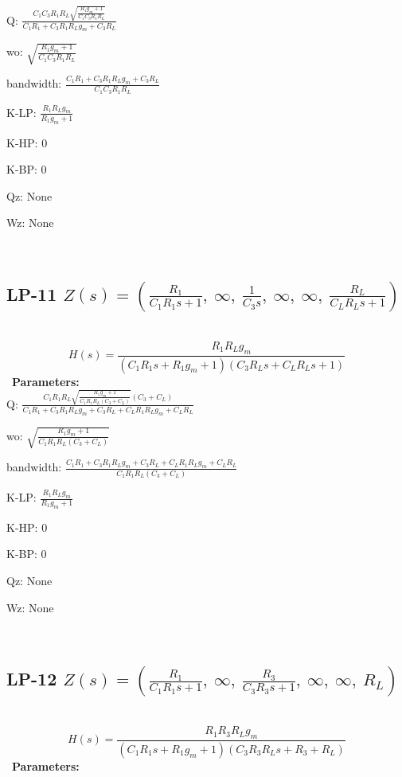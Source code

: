 \documentclass{article}
\begin{document}
Q: $\frac{C_{1} C_{3} R_{1} R_{L} \sqrt{\frac{R_{1} g_{m} + 1}{C_{1} C_{3} R_{1} R_{L}}}}{C_{1} R_{1} + C_{3} R_{1} R_{L} g_{m} + C_{3} R_{L}}$\ 

wo: $\sqrt{\frac{R_{1} g_{m} + 1}{C_{1} C_{3} R_{1} R_{L}}}$\ 

bandwidth: $\frac{C_{1} R_{1} + C_{3} R_{1} R_{L} g_{m} + C_{3} R_{L}}{C_{1} C_{3} R_{1} R_{L}}$\ 

K-LP: $\frac{R_{1} R_{L} g_{m}}{R_{1} g_{m} + 1}$\ 

K-HP: $0$\ 

K-BP: $0$\ 

Qz: $\text{None}$\ 

Wz: $\text{None}$\ 

\ 

\subsection{LP-11 $Z(s) = \left( \frac{R_{1}}{C_{1} R_{1} s + 1}, \  \infty, \  \frac{1}{C_{3} s}, \  \infty, \  \infty, \  \frac{R_{L}}{C_{L} R_{L} s + 1}\right)$ } \ 
\textbf{\[H(s) = \frac{R_{1} R_{L} g_{m}}{\left(C_{1} R_{1} s + R_{1} g_{m} + 1\right) \left(C_{3} R_{L} s + C_{L} R_{L} s + 1\right)}\] } \ 
\textbf{Parameters:}\\ 

Q: $\frac{C_{1} R_{1} R_{L} \sqrt{\frac{R_{1} g_{m} + 1}{C_{1} R_{1} R_{L} \left(C_{3} + C_{L}\right)}} \left(C_{3} + C_{L}\right)}{C_{1} R_{1} + C_{3} R_{1} R_{L} g_{m} + C_{3} R_{L} + C_{L} R_{1} R_{L} g_{m} + C_{L} R_{L}}$\ 

wo: $\sqrt{\frac{R_{1} g_{m} + 1}{C_{1} R_{1} R_{L} \left(C_{3} + C_{L}\right)}}$\ 

bandwidth: $\frac{C_{1} R_{1} + C_{3} R_{1} R_{L} g_{m} + C_{3} R_{L} + C_{L} R_{1} R_{L} g_{m} + C_{L} R_{L}}{C_{1} R_{1} R_{L} \left(C_{3} + C_{L}\right)}$\ 

K-LP: $\frac{R_{1} R_{L} g_{m}}{R_{1} g_{m} + 1}$\ 

K-HP: $0$\ 

K-BP: $0$\ 

Qz: $\text{None}$\ 

Wz: $\text{None}$\ 

\ 

\subsection{LP-12 $Z(s) = \left( \frac{R_{1}}{C_{1} R_{1} s + 1}, \  \infty, \  \frac{R_{3}}{C_{3} R_{3} s + 1}, \  \infty, \  \infty, \  R_{L}\right)$ } \ 
\textbf{\[H(s) = \frac{R_{1} R_{3} R_{L} g_{m}}{\left(C_{1} R_{1} s + R_{1} g_{m} + 1\right) \left(C_{3} R_{3} R_{L} s + R_{3} + R_{L}\right)}\] } \ 
\textbf{Parameters:}\\ 
\end{document}
